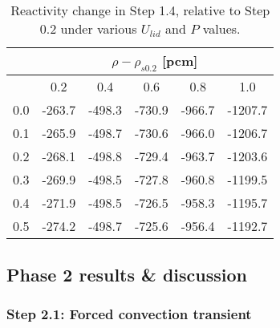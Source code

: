 \begin{table}[htbp!]
	\caption{Reactivity change in Step 1.4, relative to Step 0.2 under various
	$U_{lid}$ and $P$ values.}
	\centering
	\small
	\setlength\tabcolsep{1.5pt}
	\begin{tabular}{c c c c c c}
		\toprule
		& \multicolumn{5}{c}{$\rho - \rho_{s0.2}$ [pcm]} \\
		\midrule
		{\backslashbox{$U_{lid}$ [m$\cdot$s$^{-1}$]}{$P$ [GW]}} & 0.2 & 0.4 & 0.6 & 0.8 & 1.0 \\
		\midrule
		0.0 & -263.7 & -498.3 & -730.9 & -966.7 & -1207.7 \\
		0.1 & -265.9 & -498.7 & -730.6 & -966.0 & -1206.7 \\
		0.2 & -268.1 & -498.8 & -729.4 & -963.7 & -1203.6 \\
		0.3 & -269.9 & -498.5 & -727.8 & -960.8 & -1199.5 \\
		0.4 & -271.9 & -498.5 & -726.5 & -958.3 & -1195.7 \\
		0.5 & -274.2 & -498.7 & -725.6 & -956.4 & -1192.7 \\
		\bottomrule
	\end{tabular}
	\label{table:full}
\end{table}

\subsection{Phase 2 results \& discussion}

\subsubsection{Step 2.1: Forced convection transient}
